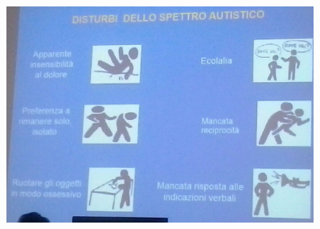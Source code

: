 \begin{figure}[!ht]
\centering
	\includegraphics[width=0.9\textwidth]{014/image3.png}
\end{figure}

